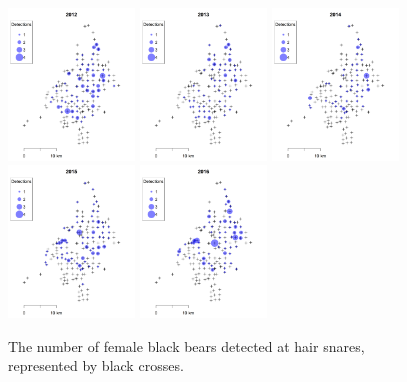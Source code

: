 \documentclass[12pt]{article}
\begin{document}
\begin{figure}[h!]
  \setlength{\fboxsep}{0pt}
  \centering
  {\includegraphics[width=0.3\textwidth]{figs/dets2012}} \hfill
  {\includegraphics[width=0.3\textwidth]{figs/dets2013}} \hfill
  {\includegraphics[width=0.3\textwidth]{figs/dets2014}} \\
  {\includegraphics[width=0.3\textwidth]{figs/dets2015}} \hspace{12pt}
  {\includegraphics[width=0.3\textwidth]{figs/dets2016}} %
  \caption{The number of female black bears detected at hair
    snares, represented by black crosses.}
  \label{fig:detmaps}
\end{figure}
\end{document}
